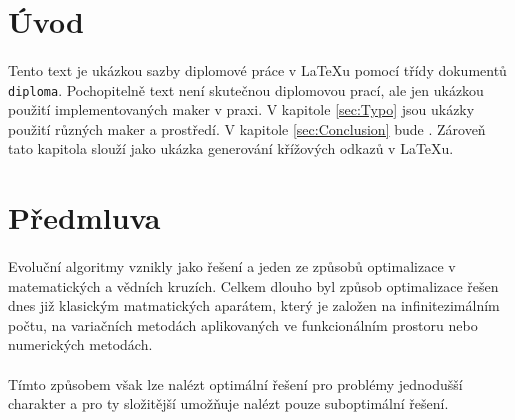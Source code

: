 \documentclass[bc,male,java,dept460]{diploma}		%
\begin{document}
\MakeTitlePages

\tableofcontents
\cleardoublepage	%

\listoftables
\cleardoublepage	%

\listoffigures
\cleardoublepage	%

\lstlistoflistings
\cleardoublepage	%

\section{Úvod}
\label{sec:Uvod}
\paragraph*{}
Tento text je ukázkou sazby diplomové práce v \LaTeX{}u pomocí třídy dokumentů \verb|diploma|.
Pochopitelně text není skutečnou diplomovou prací, ale jen ukázkou použití
implementovaných maker v praxi. V kapitole \ref{sec:Typo} jsou ukázky použití
různých maker a prostředí. V kapitole \ref{sec:Conclusion} bude . Zároveň
tato kapitola slouží jako ukázka generování křížových odkazů v \LaTeX{}u.

\section{Předmluva}
\label{sec:Predmluva}
\paragraph*{}
Evoluční algoritmy vznikly jako řešení a jeden ze způsobů optimalizace v matematických a vědních kruzích. Celkem dlouho byl způsob optimalizace řešen dnes již klasickým matmatických aparátem, který je založen na infinitezimálním počtu, na variačních metodách aplikovaných ve funkcionálním prostoru nebo numerických metodách.
\paragraph*{}
Tímto způsobem však lze nalézt optimální řešení pro problémy jednodušší charakter a pro ty složitější umožňuje nalézt pouze suboptimální řešení.
\end{document}
